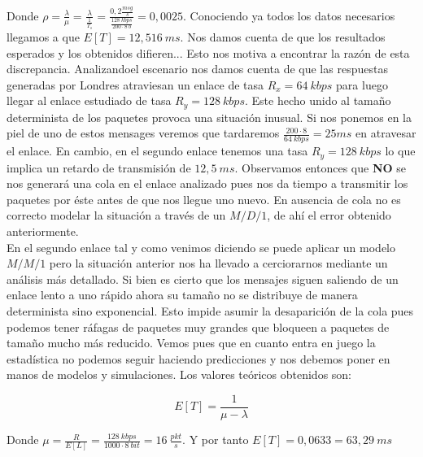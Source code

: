 \documentclass{article}[12 pt]
\begin{document}
		Donde $\rho = \frac{\lambda}{\mu} = \frac{\lambda}{\frac{1}{T_s}} = \frac{0,2 \frac{msg}{s}}{\frac{128\ kbps}{200 \cdot 8\ b}} = 0,0025$. Conociendo ya todos los datos necesarios llegamos a que $E[T] = 12,516\ ms$. Nos damos cuenta de que los resultados esperados y los obtenidos difieren... Esto nos motiva a encontrar la razón de esta discrepancia. Analizandoel escenario nos damos cuenta de que las respuestas generadas por Londres atraviesan un enlace de tasa $R_x = 64\ kbps$ para luego llegar al enlace estudiado de tasa $R_y = 128\ kbps$. Este hecho unido al tamaño determinista de los paquetes provoca una situación inusual. Si nos ponemos en la piel de uno de estos mensages veremos que tardaremos $\frac{200 \cdot 8}{64\ kbps} = 25 ms$ en atravesar el enlace. En cambio, en el segundo enlace tenemos una tasa $R_y = 128\ kbps$ lo que implica un retardo de transmisión de $12,5\ ms$. Observamos entonces que \textbf{NO} se nos generará una cola en el enlace analizado pues nos da tiempo a transmitir los paquetes por éste antes de que nos llegue uno nuevo. En ausencia de cola no es correcto modelar la situación a través de un $M/D/1$, de ahí el error obtenido anteriormente.
		\\

		En el segundo enlace tal y como venimos diciendo se puede aplicar un modelo $M/M/1$ pero la situación anterior nos ha llevado a cerciorarnos mediante un análisis más detallado. Si bien es cierto que los mensajes siguen saliendo de un enlace lento a uno rápido ahora su tamaño no se distribuye de manera determinista sino exponencial. Esto impide asumir la desaparición de la cola pues podemos tener ráfagas de paquetes muy grandes que bloqueen a paquetes de tamaño mucho más reducido. Vemos pues que en cuanto entra en juego la estadística no podemos seguir haciendo predicciones y nos debemos poner en manos de modelos y simulaciones. Los valores teóricos obtenidos son:

		$$E[T] = \frac{1}{\mu - \lambda}$$

		Donde $\mu = \frac{R}{E[L]} = \frac{128\ kbps}{1000 \cdot 8\ bit} = 16\ \frac{pkt}{s}$. Y por tanto $E[T] = 0,0633 = 63,29\ ms$
\end{document}
